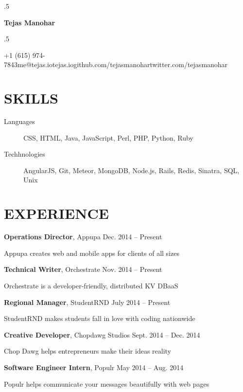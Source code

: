 \documentclass{res}
\newcommand*{\its}{\hspace{0.8cm}}
\begin{document}
\moveleft.5\hoffset\centerline{\Huge\bf Tejas Manohar}
\bigskip
\moveleft.5\hoffset\centerline{+1 (615) 974-7843\its{}me@tejas.io\its{}\its{}tejas.io\its{}github.com/tejasmanohar\its{}twitter.com/tejasmanohar}

\section{SKILLS}

\begin{description}
  \item[Languages] CSS, HTML, Java, JavaScript, Perl, PHP, Python, Ruby
  \item[Techhnologies] AngularJS, Git, Meteor, MongoDB, Node.js, Rails, Redis, Sinatra, SQL, Unix
\end{description}

\section{EXPERIENCE}

{\bf Operations Director}, Appupa \hfill Dec. 2014 -- Present
\begin{description}
  \item Appupa creates web and mobile apps for clients of all sizes
\end{description}

{\bf Technical Writer}, Orchestrate \hfill Nov. 2014 -- Present
\begin{description}
  \item Orchestrate is a developer-friendly, distributed KV DBaaS
\end{description}

{\bf Regional Manager}, StudentRND \hfill July 2014 -- Present
\begin{description}
  \item StudentRND makes students fall in love with coding nationwide
\end{description}

{\bf Creative Developer}, Chopdawg Studios \hfill Sept. 2014 -- Dec. 2014
\begin{description}
  \item Chop Dawg helps entrepreneurs make their ideas reality
\end{description}

{\bf Software Engineer Intern}, Populr \hfill May 2014 -- Aug. 2014
\begin{description}
  \item Populr helps communicate your messages beautifully with web pages
\end{description}
\end{document}
